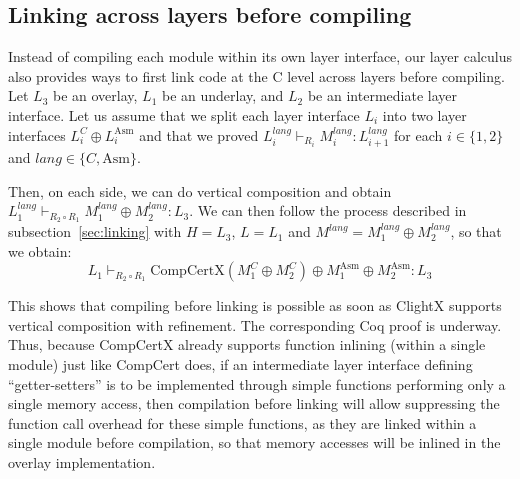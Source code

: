 \subsection{Linking across layers before compiling}

Instead of compiling each module within its own layer interface, our layer
calculus also provides ways to first link code at the C level across
layers before compiling. Let $L_3$ be an overlay, $L_1$ be an
underlay, and $L_2$ be an intermediate layer interface. Let us assume that we
split each layer interface $L_i$ into two layer interfaces $L_i^C \oplus
L_i^{\mathrm{Asm}}$ and that we proved $L_{i}^{\mathit{lang}} \vdash_{R_i}
M_i^{\mathit{lang}}: L_{i+1}^{\mathit{lang}}$ for each $i \in \{1,2
\}$ and $\mathit{lang} \in \{ C, \mathrm{Asm} \}$.

Then, on each side, we can do vertical composition and obtain
$L_1^{\mathit{lang}} \vdash_{R_2 \circ R_1} M_1^{\mathit{lang}} \oplus
M_2^{\mathit{lang}} : L_3$. We can then follow the process described
in subsection~\ref{sec:linking} with $H = L_3$, $L = L_1$ and
$M^{\mathit{lang}} = M_1^{\mathit{lang}} \oplus M_2^{\mathit{lang}}$, so that we obtain:
\[
L_1 \vdash_{R_2 \circ R_1} \mathrm{CompCertX}(M_1^C \oplus M_2^C) \oplus M_1^{\mathrm{Asm}} \oplus M_2^{\mathrm{Asm}}: L_3
\]

This shows that compiling before linking is possible as soon as
ClightX supports vertical composition with refinement. The
corresponding Coq proof is underway. Thus, because CompCertX already
supports function inlining (within a single module) just like CompCert
does, if an intermediate layer interface defining ``getter-setters'' is to be
implemented through simple functions performing only a single memory
access, then compilation before linking will allow suppressing the
function call overhead for these simple functions, as they are linked
within a single module before compilation, so that memory accesses
will be inlined in the overlay implementation.

